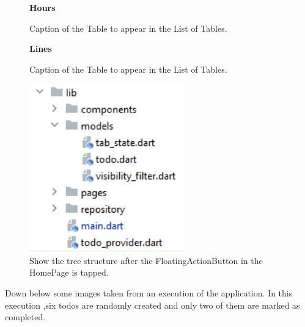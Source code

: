 \begin{figure}[H]
 \caption*{\textbf{Hours}}
\centering
{}
 \caption{Caption of the Table to appear in the List of Tables.}
\end{figure}
\begin{figure}[H]

\caption*{\textbf{Lines}}
\centering
{}
 \caption{Caption of the Table to appear in the List of Tables.}
\end{figure}


\begin{figure}[H]
    \centering
    \includegraphics[width=0.6\textwidth]{Images/struttura_cartelle_inherited.png}
    \caption{Show the tree structure after the FloatingActionButton in the HomePage is tapped.}
    \label{fig:add_todo_page_tree_structure}
\end{figure}
Down below some images taken from an execution of the application. In this execution ,six todos are randomly created and only two of them are marked as completed. 

